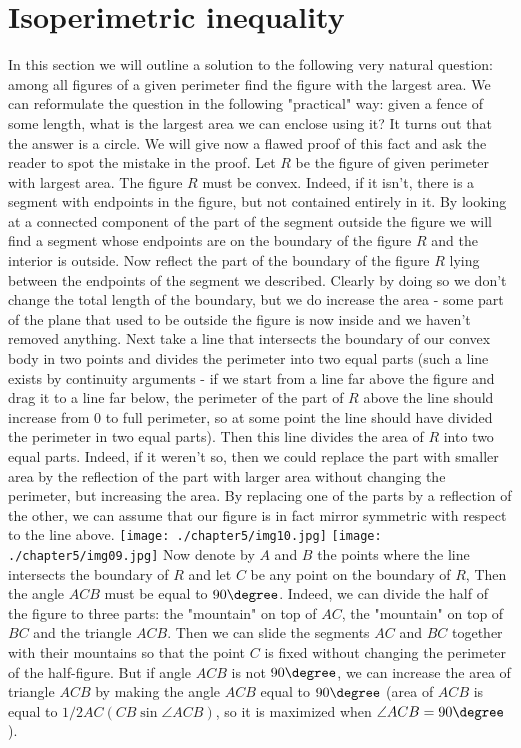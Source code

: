 \section{Isoperimetric inequality}
In this section we will outline a solution to the following very natural question: among all figures of a given perimeter find the figure with the largest area. We can reformulate the question in the following "practical" way: given a fence of some length, what is the largest area we can enclose using it?
It turns out that the answer is a circle.
We will give now a flawed proof of this fact and ask the reader to spot the mistake in the proof.
Let $R$ be the figure of given perimeter with largest area. The figure $R$ must be convex. Indeed, if it isn't, there is a segment with endpoints in the figure, but not contained entirely in it. By looking at a connected component of the part of the segment outside the figure we will find a segment whose endpoints are on the boundary of the figure $R$ and the interior is outside. Now reflect the part of the boundary of the figure $R$ lying between the endpoints of the segment we described. Clearly by doing so we don't change the total length of the boundary, but we do increase the area - some part of the plane that used to be outside the figure is now inside and we haven't removed anything.
Next take a line that intersects the boundary of our convex body in two points and divides the perimeter into two equal parts (such a line exists by continuity arguments - if we start from a line far above the figure and drag it to a line far below, the perimeter of the part of $R$ above the line should increase from 0 to full perimeter, so at some point the line should have divided the perimeter in two equal parts). Then this line divides the area of $R$ into two equal parts. Indeed, if it weren't so, then we could replace the part with smaller area by the reflection of the part with larger area without changing the perimeter, but increasing the area.
By replacing one of the parts by a reflection of the other, we can assume that our figure is in fact mirror symmetric with respect to the line above.
\texttt{[image: ./chapter5/img10.jpg]}
\texttt{[image: ./chapter5/img09.jpg]}
Now denote by $A$ and $B$ the points where the line intersects the boundary of $R$ and let $C$ be any point on the boundary of $R$, Then the angle $ACB$ must be equal to $90\degree$. Indeed, we can divide the half of the figure to three parts: the "mountain" on top of $AC$, the "mountain" on top of $BC$ and the triangle $ACB$. Then we can slide the segments $AC$ and $BC$ together with their mountains so that the point $C$ is fixed without changing the perimeter of the half-figure. But if angle $ACB$ is not $90\degree$, we can increase the area of triangle $ACB$ by making the angle $ACB$ equal to $90\degree$ (area of $ACB$ is equal to $1/2 AC (CB \sin \angle ACB)$, so it is maximized when $\angle ACB=90\degree$).
